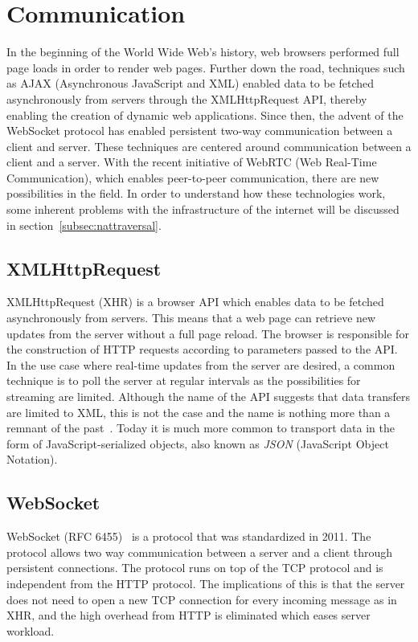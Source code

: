 \section{Communication}
\label{sec:communication}
In the beginning of the World Wide Web's history, web browsers performed full page loads in order to render web pages. Further down the road, techniques such as AJAX (Asynchronous JavaScript and XML) enabled data to be fetched asynchronously from servers through the XMLHttpRequest API, thereby enabling the creation of dynamic web applications. Since then, the advent of the WebSocket protocol has enabled persistent two-way communication between a client and server. These techniques are centered around communication between a client and a server. With the recent initiative of WebRTC (Web Real-Time Communication), which enables peer-to-peer communication, there are new possibilities in the field. In order to understand how these technologies work, some inherent problems with the infrastructure of the internet will be discussed in section~\ref{subsec:nattraversal}.

\subsection{XMLHttpRequest}
XMLHttpRequest (XHR) is a browser API which enables data to be fetched asynchronously from servers. This means that a web page can retrieve new updates from the server without a full page reload. The browser is responsible for the construction of HTTP requests according to parameters passed to the API. In the use case where real-time updates from the server are desired, a common technique is to poll the server at regular intervals as the possibilities for streaming are limited. Although the name of the API suggests that data transfers are limited to XML, this is not the case and the name is nothing more than a remnant of the past~\cite{XHR:Online}. Today it is much more common to transport data in the form of JavaScript-serialized objects, also known as \emph{JSON} (JavaScript Object Notation).

\subsection{WebSocket}
WebSocket (RFC 6455)~\cite{RFC6455:Online} is a protocol that was standardized in 2011. The protocol allows two way communication between a server and a client through persistent connections. The protocol runs on top of the TCP protocol and is independent from the HTTP protocol. The implications of this is that the server does not need to open a new TCP connection for every incoming message as in XHR, and the high overhead from HTTP is eliminated which eases server workload.

